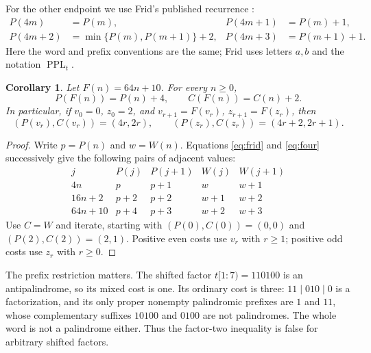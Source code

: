 \documentclass[11pt]{article}
\newtheorem{corollary}[theorem]{Corollary}
\begin{document}
For the other endpoint we use Frid's published recurrence
\cite[Theorem~4, equations (1)--(4)]{Frid}:
\begin{align}
 P(4m)&=P(m),&P(4m+1)&=P(m)+1,\nonumber\\
 P(4m+2)&=\min\{P(m),P(m+1)\}+2,
 &P(4m+3)&=P(m+1)+1.\label{eq:frid}
\end{align}
Here the word and prefix conventions are the same; Frid uses letters
$a,b$ and the notation $\operatorname{PPL}_t$.

\begin{corollary}\label{cor:sharp}
Let $F(n)=64n+10$. For every $n\geq0$,
\[
 P(F(n))=P(n)+4,\qquad C(F(n))=C(n)+2.
\]
In particular, if $v_0=0$, $z_0=2$, and
$v_{r+1}=F(v_r)$, $z_{r+1}=F(z_r)$, then
\[
 (P(v_r),C(v_r))=(4r,2r),\qquad
 (P(z_r),C(z_r))=(4r+2,2r+1).
\]
\end{corollary}
\begin{proof}
Write $p=P(n)$ and $w=W(n)$. Equations \eqref{eq:frid} and
\eqref{eq:four} successively give the following pairs of adjacent values:
\[
\begin{array}{c|cc|cc}
 j&P(j)&P(j+1)&W(j)&W(j+1)\\\hline
 4n&p&p+1&w&w+1\\
 16n+2&p+2&p+2&w+1&w+2\\
 64n+10&p+4&p+3&w+2&w+3
\end{array}
\]
Use $C=W$ and iterate, starting with $(P(0),C(0))=(0,0)$ and
$(P(2),C(2))=(2,1)$. Positive even costs use $v_r$ with $r\geq1$;
positive odd costs use $z_r$ with $r\geq0$.
\end{proof}

The prefix restriction matters. The shifted factor $t[1:7)=110100$
is an antipalindrome, so its mixed cost is one. Its ordinary cost is
three: $11\mid010\mid0$ is a factorization, and its only proper
nonempty palindromic prefixes are $1$ and $11$, whose complementary
suffixes $10100$ and $0100$ are not palindromes. The whole word is not
a palindrome either. Thus the factor-two inequality is false for
arbitrary shifted factors.

\clearpage
\end{document}
